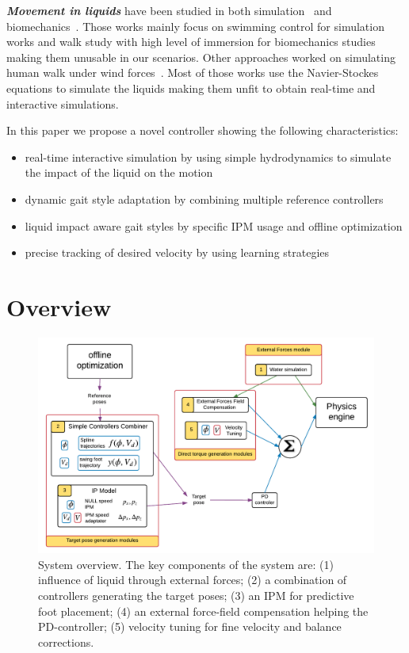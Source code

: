 \documentclass[conference]{acmsiggraph}
\begin{document}
\textbf{\textit{Movement in liquids}} have been studied in both simulation~\cite{yang2004layered,si2014realistic} and biomechanics~\cite{barela2006biomechanical,chevutschi2009comparison}. Those works mainly focus on swimming control for simulation works and walk study with high level of immersion for biomechanics studies making them unusable in our scenarios. Other approaches worked on simulating human walk under wind forces~\cite{lentine2011creature}. Most of those works use the Navier-Stockes equations to simulate the liquids making them unfit to obtain real-time and interactive simulations.

In this paper we propose a novel controller showing the following characteristics:
\begin{itemize}
\item{real-time interactive simulation by using simple hydrodynamics to simulate the impact of the liquid on the motion}
\item{dynamic gait style adaptation by combining multiple reference controllers}
\item{liquid impact aware gait styles by specific IPM usage and offline optimization}
\item{precise tracking of desired velocity by using learning strategies}
\end{itemize}

\section{Overview}
\label{sec:overview}

\begin{figure}[t]
\centering
\includegraphics[scale=0.45]{images/general_process.pdf}
\caption{System overview. The key components of the system are: (1) influence of liquid through external forces; (2) a combination of controllers generating the target poses; (3) an IPM for predictive foot placement; (4) an external force-field compensation helping the PD-controller; (5) velocity tuning for fine velocity and balance corrections.}
\label{fig:shema_controler}
\end{figure}
\end{document}
